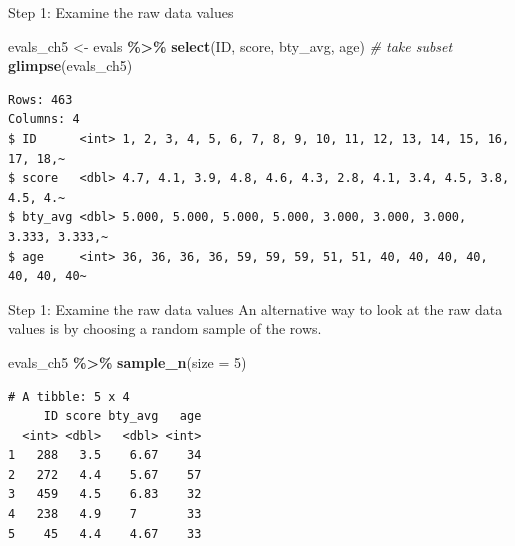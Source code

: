 \documentclass[
  ignorenonframetext,
]{beamer}
\newenvironment{Shaded}{\begin{snugshade}}{\end{snugshade}}
\newcommand{\AttributeTok}[1]{\textcolor[rgb]{0.13,0.29,0.53}{#1}}
\newcommand{\CommentTok}[1]{\textcolor[rgb]{0.56,0.35,0.01}{\textit{#1}}}
\newcommand{\DecValTok}[1]{\textcolor[rgb]{0.00,0.00,0.81}{#1}}
\newcommand{\FunctionTok}[1]{\textcolor[rgb]{0.13,0.29,0.53}{\textbf{#1}}}
\newcommand{\NormalTok}[1]{#1}
\newcommand{\OtherTok}[1]{\textcolor[rgb]{0.56,0.35,0.01}{#1}}
\newcommand{\SpecialCharTok}[1]{\textcolor[rgb]{0.81,0.36,0.00}{\textbf{#1}}}
\begin{document}
\begin{frame}[fragile]{Step 1: Examine the raw data values}
\protect\hypertarget{step-1-examine-the-raw-data-values}{}
\normalsize

\begin{Shaded}
\begin{Highlighting}[]
\NormalTok{evals\_ch5 }\OtherTok{\textless{}{-}}\NormalTok{ evals }\SpecialCharTok{\%\textgreater{}\%}
  \FunctionTok{select}\NormalTok{(ID, score, bty\_avg, age)   }\CommentTok{\# take subset}
\FunctionTok{glimpse}\NormalTok{(evals\_ch5)}
\end{Highlighting}
\end{Shaded}

\begin{verbatim}
Rows: 463
Columns: 4
$ ID      <int> 1, 2, 3, 4, 5, 6, 7, 8, 9, 10, 11, 12, 13, 14, 15, 16, 17, 18,~
$ score   <dbl> 4.7, 4.1, 3.9, 4.8, 4.6, 4.3, 2.8, 4.1, 3.4, 4.5, 3.8, 4.5, 4.~
$ bty_avg <dbl> 5.000, 5.000, 5.000, 5.000, 3.000, 3.000, 3.000, 3.333, 3.333,~
$ age     <int> 36, 36, 36, 36, 59, 59, 59, 51, 51, 40, 40, 40, 40, 40, 40, 40~
\end{verbatim}

\normalsize
\end{frame}

\begin{frame}[fragile]{Step 1: Examine the raw data values}
\protect\hypertarget{step-1-examine-the-raw-data-values-1}{}
An alternative way to look at the raw data values is by choosing a
random sample of the rows.

\normalsize

\begin{Shaded}
\begin{Highlighting}[]
\NormalTok{evals\_ch5 }\SpecialCharTok{\%\textgreater{}\%}
  \FunctionTok{sample\_n}\NormalTok{(}\AttributeTok{size =} \DecValTok{5}\NormalTok{)}
\end{Highlighting}
\end{Shaded}

\begin{verbatim}
# A tibble: 5 x 4
     ID score bty_avg   age
  <int> <dbl>   <dbl> <int>
1   288   3.5    6.67    34
2   272   4.4    5.67    57
3   459   4.5    6.83    32
4   238   4.9    7       33
5    45   4.4    4.67    33
\end{verbatim}

\normalsize
\end{frame}
\end{document}
